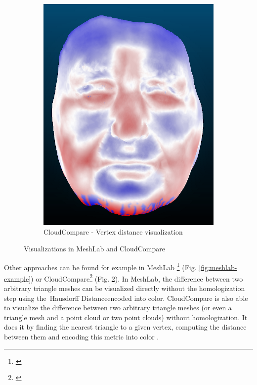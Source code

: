 \begin{figure}[h]
\begin{subfigure}{0.3\textwidth}
	\includegraphics[width=\textwidth]{./img/cloudcompare-example01.PNG}
    \caption[CloudCompare - Vertex distance visualization]{CloudCompare - Vertex distance visualization}
    \label{fig:cloudcompare-example}
	\end{subfigure}
\caption{Visualizations in MeshLab and CloudCompare}
\end{figure}

Other approaches can be found for example in MeshLab \footnote{\citet{MeshLab}} (Fig. \ref{fig:meshlab-example}) or CloudCompare\footnote{\citet{CloudCmp}} (Fig. \ref{fig:cloudcompare-example}). In MeshLab, the difference between two arbitrary triangle meshes can be visualized directly without the homologization step using the~Hausdorff Distance\footnotemark encoded into color. CloudCompare is also able to visualize the difference between two arbitrary triangle meshes (or even a triangle mesh and a point cloud or two point clouds) without homologization. It does it by finding the nearest triangle to a given vertex, computing the distance between them and encoding this metric into color \citep{CloudCmpDistance}.

